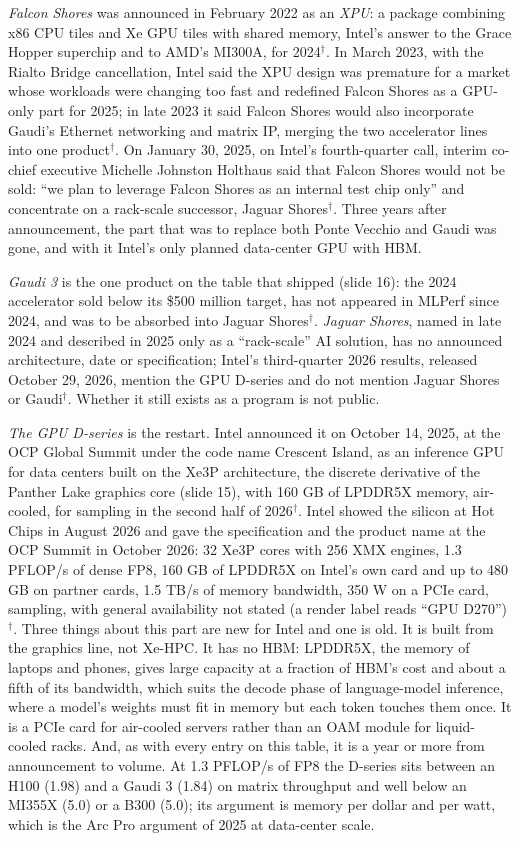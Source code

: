 \documentclass[11pt,letterpaper]{article}
\begin{document}
\emph{Falcon Shores} was announced in February 2022 as an \emph{XPU}: a package combining x86 CPU tiles and Xe GPU tiles with shared memory, Intel's answer to the Grace Hopper superchip and to AMD's MI300A, for 2024$^\dagger$. In March 2023, with the Rialto Bridge cancellation, Intel said the XPU design was premature for a market whose workloads were changing too fast and redefined Falcon Shores as a GPU-only part for 2025; in late 2023 it said Falcon Shores would also incorporate Gaudi's Ethernet networking and matrix IP, merging the two accelerator lines into one product$^\dagger$. On January 30, 2025, on Intel's fourth-quarter call, interim co-chief executive Michelle Johnston Holthaus said that Falcon Shores would not be sold: ``we plan to leverage Falcon Shores as an internal test chip only'' and concentrate on a rack-scale successor, Jaguar Shores$^\dagger$. Three years after announcement, the part that was to replace both Ponte Vecchio and Gaudi was gone, and with it Intel's only planned data-center GPU with HBM.

\emph{Gaudi 3} is the one product on the table that shipped (slide 16): the 2024 accelerator sold below its \$500 million target, has not appeared in MLPerf since 2024, and was to be absorbed into Jaguar Shores$^\dagger$. \emph{Jaguar Shores}, named in late 2024 and described in 2025 only as a ``rack-scale'' AI solution, has no announced architecture, date or specification; Intel's third-quarter 2026 results, released October 29, 2026, mention the GPU D-series and do not mention Jaguar Shores or Gaudi$^\dagger$. Whether it still exists as a program is not public.

\emph{The GPU D-series} is the restart. Intel announced it on October 14, 2025, at the OCP Global Summit under the code name Crescent Island, as an inference GPU for data centers built on the Xe3P architecture, the discrete derivative of the Panther Lake graphics core (slide 15), with 160 GB of LPDDR5X memory, air-cooled, for sampling in the second half of 2026$^\dagger$. Intel showed the silicon at Hot Chips in August 2026 and gave the specification and the product name at the OCP Summit in October 2026: 32 Xe3P cores with 256 XMX engines, 1.3 PFLOP/s of dense FP8, 160 GB of LPDDR5X on Intel's own card and up to 480 GB on partner cards, 1.5 TB/s of memory bandwidth, 350 W on a PCIe card, sampling, with general availability not stated (a render label reads ``GPU D270'')$^\dagger$. Three things about this part are new for Intel and one is old. It is built from the graphics line, not Xe-HPC. It has no HBM: LPDDR5X, the memory of laptops and phones, gives large capacity at a fraction of HBM's cost and about a fifth of its bandwidth, which suits the decode phase of language-model inference, where a model's weights must fit in memory but each token touches them once. It is a PCIe card for air-cooled servers rather than an OAM module for liquid-cooled racks. And, as with every entry on this table, it is a year or more from announcement to volume. At 1.3 PFLOP/s of FP8 the D-series sits between an H100 (1.98) and a Gaudi 3 (1.84) on matrix throughput and well below an MI355X (5.0) or a B300 (5.0); its argument is memory per dollar and per watt, which is the Arc Pro argument of 2025 at data-center scale.
\end{document}
